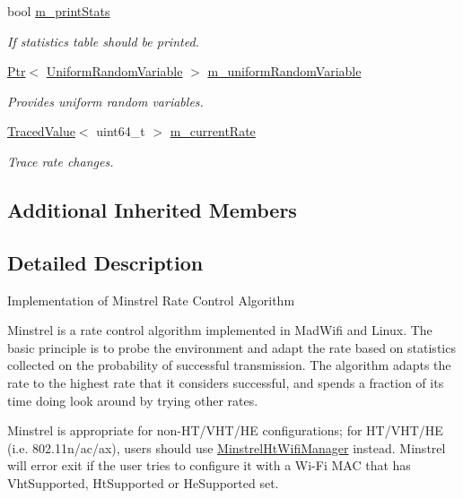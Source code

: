 \begin{DoxyCompactItemize}
bool \hyperlink{classns3_1_1MinstrelWifiManager_a81802688a5cc3f6136f54264f2e3bcd5}{m\+\_\+print\+Stats}
\begin{DoxyCompactList}\small\item\em If statistics table should be printed. \end{DoxyCompactList}\item 
\hyperlink{classns3_1_1Ptr}{Ptr}$<$ \hyperlink{classns3_1_1UniformRandomVariable}{Uniform\+Random\+Variable} $>$ \hyperlink{classns3_1_1MinstrelWifiManager_a63a489eb04c046ac3fe29b514d5eb028}{m\+\_\+uniform\+Random\+Variable}
\begin{DoxyCompactList}\small\item\em Provides uniform random variables. \end{DoxyCompactList}\item 
\hyperlink{classns3_1_1TracedValue}{Traced\+Value}$<$ uint64\+\_\+t $>$ \hyperlink{classns3_1_1MinstrelWifiManager_aba1b46b41de3b8b0b4279d0c5adad57e}{m\+\_\+current\+Rate}
\begin{DoxyCompactList}\small\item\em Trace rate changes. \end{DoxyCompactList}\end{DoxyCompactItemize}
\subsection*{Additional Inherited Members}


\subsection{Detailed Description}
Implementation of Minstrel Rate Control Algorithm

Minstrel is a rate control algorithm implemented in Mad\+Wifi and Linux. The basic principle is to probe the environment and adapt the rate based on statistics collected on the probability of successful transmission. The algorithm adapts the rate to the highest rate that it considers successful, and spends a fraction of its time doing \textquotesingle{}look around\textquotesingle{} by trying other rates. 

Minstrel is appropriate for non-\/\+H\+T/\+V\+H\+T/\+HE configurations; for H\+T/\+V\+H\+T/\+HE (i.\+e. 802.\+11n/ac/ax), users should use \hyperlink{classns3_1_1MinstrelHtWifiManager}{Minstrel\+Ht\+Wifi\+Manager} instead. Minstrel will error exit if the user tries to configure it with a Wi-\/\+Fi M\+AC that has Vht\+Supported, Ht\+Supported or He\+Supported set.

